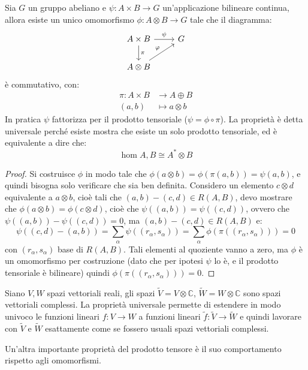 \begin{proposition}
  Sia $ G $ un gruppo abeliano e $ \psi \colon A \times B \to G $ un'applicazione bilineare continua,
  allora esiste un unico omomorfismo $ \phi \colon A \otimes B \to G $ tale che il diagramma:
  \[
    \begin{tikzcd}
      A \times B \rar{\psi} \dar{\pi} & G \\
      A \otimes B \arrow{ru}{\phi} & {}
    \end{tikzcd}
  \]
  è commutativo, con:
  \begin{align*}
    \pi \colon A \times B & \to A \oplus B \\
    (a,b) & \mapsto a \otimes b
  \end{align*}
  In pratica $ \psi $ fattorizza per il prodotto tensoriale
  ($ \psi = \phi \circ \pi $). La proprietà è detta universale perché esiste mostra che
  esiste un solo prodotto tensoriale, ed è equivalente a dire
  che:
  \[
    \hom{A,B} \cong A^* \otimes B
  \]
\end{proposition}
\begin{proof}
  Si costruisce $ \phi $ in modo tale che
  $ \phi(a \otimes b) = \phi(\pi(a,b)) = \psi(a,b) $, e quindi bisogna solo verificare che sia ben
  definita. Considero un elemento $ c \otimes d $ equivalente a $ a \otimes b $, cioè tali
  che $ (a,b) - (c,d) \in R(A,B) $, devo mostrare che
  $ \phi(a \otimes b) = \phi(c \otimes d) $, cioè che
  $ \psi((a,b)) = \psi((c,d)) $, ovvero che $ \psi((a,b)) - \psi((c,d)) = 0 $, ma
  $ (a,b) - (c,d) \in R(A,B) $ e:
  \[
    \psi((c,d) - (a,b)) = \sum_\alpha \psi((r_\alpha, s_\alpha)) = \sum_\alpha \phi \left(\pi((r_\alpha, s_\alpha))\right) = 0
  \]
  con $ (r_\alpha,s_\alpha) $ base di $ R(A,B) $. Tali elementi al quoziente vanno a zero,
  ma $ \phi $ è un omomorfismo per costruzione (dato che per ipotesi $ \psi $ lo è, e
  il prodotto tensoriale è bilineare) quindi $ \phi(\pi((r_\alpha, s_\alpha))) = 0 $.
\end{proof}
\begin{example}
  Siano $ V, W $ spazi vettoriali reali, gli spazi
  $ \tilde{V} = V \otimes \mathbb{C} $, $ \tilde{W} = W \otimes \mathbb{C} $ sono spazi
  vettoriali complessi. La proprietà universale permette di estendere in modo
  univoco le funzioni lineari $ f \colon V \to W $ a funzioni lineari
  $ \tilde{f} : \tilde{V} \to \tilde{W} $ e quindi lavorare con $ \tilde{V} $ e
  $ \tilde{W} $ esattamente come se fossero usuali spazi vettoriali complessi.
\end{example}
Un'altra importante proprietà del prodotto tensore è il suo comportamento
rispetto agli omomorfismi.


